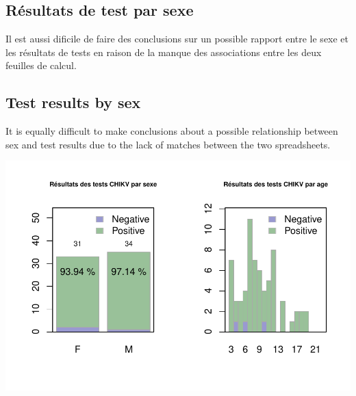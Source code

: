 \documentclass[11pt]{article}
\begin{document}
\begin{multicols}{2} 


\subsection*{Résultats de test par sexe}
Il est aussi dificile de faire des conclusions sur un possible rapport entre le sexe et les résultats de tests en raison de la manque des associations entre les deux feuilles de calcul.

\vfill
\columnbreak

\subsection*{Test results by sex}
It is equally difficult to make conclusions about a possible relationship between sex and test results due to the lack of matches between the two spreadsheets.

\end{multicols}
\begin{center}
\includegraphics{chik_analyse_pour_madsen-008}
\end{center}
\begin{multicols}{2} 




\end{multicols}
% 
% 
% 
\end{document}
